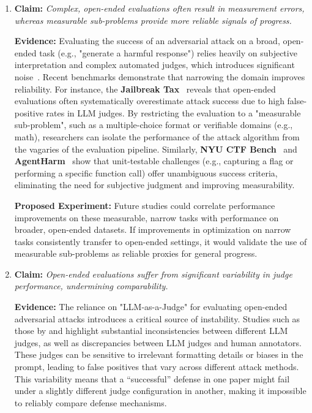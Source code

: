 \begin{enumerate}
    \item \textbf{Claim:} \textit{Complex, open-ended evaluations often result in measurement errors, whereas measurable sub-problems provide more reliable signals of progress.}
    
    \textbf{Evidence:} 
    Evaluating the success of an adversarial attack on a broad, open-ended task (e.g., "generate a harmful response") relies heavily on subjective interpretation and complex automated judges, which introduces significant noise~\cite{beyer2025llm}. Recent benchmarks demonstrate that narrowing the domain improves reliability. For instance, the \textbf{Jailbreak Tax}~\cite{nikolic2025jailbreak} reveals that open-ended evaluations often systematically overestimate attack success due to high false-positive rates in LLM judges. By restricting the evaluation to a "measurable sub-problem", such as a multiple-choice format or verifiable domains (e.g., math), researchers can isolate the performance of the attack algorithm from the vagaries of the evaluation pipeline. Similarly, \textbf{NYU CTF Bench}~\cite{shao2025nyu} and \textbf{AgentHarm}~\cite{andriushchenko2024agentharm} show that unit-testable challenges (e.g., capturing a flag or performing a specific function call) offer unambiguous success criteria, eliminating the need for subjective judgment and improving measurability.
    
    \textbf{Proposed Experiment:} 
    Future studies could correlate performance improvements on these measurable, narrow tasks with performance on broader, open-ended datasets. If improvements in optimization on narrow tasks consistently transfer to open-ended settings, it would validate the use of measurable sub-problems as reliable proxies for general progress.

    \item \textbf{Claim:} \textit{Open-ended evaluations suffer from significant variability in judge performance, undermining comparability.}
    
    \textbf{Evidence:} 
    The reliance on "LLM-as-a-Judge" for evaluating open-ended adversarial attacks introduces a critical source of instability. Studies such as those by \citet{li2025llms} and \citet{beyer2025llm} highlight substantial inconsistencies between different LLM judges, as well as discrepancies between LLM judges and human annotators. These judges can be sensitive to irrelevant formatting details or biases in the prompt, leading to false positives that vary across different attack methods. This variability means that a \enquote{successful} defense in one paper might fail under a slightly different judge configuration in another, making it impossible to reliably compare defense mechanisms.
    

\end{enumerate}

